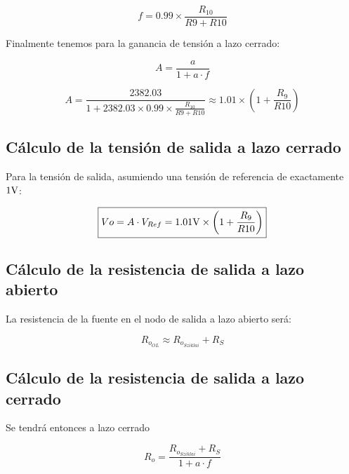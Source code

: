 \begin{equation}
f = 0.99 \times \frac{R_{10}}{R{9} + R{10}}
\end{equation}



Finalmente tenemos para la ganancia de tensión a lazo cerrado:


\begin{equation}
A = \frac{a}{1 + a \cdot f}
\end{equation}

\begin{equation*}
\boxed{ A = \frac{2382.03}{1 + 2382.03 \times 0.99 \times \frac{R_{10}}{R{9} + R{10}}} \approx 1.01 \times \left(  1 + \frac{R_{9}}{R{10}} \right) }
\end{equation*}

\subsection{Cálculo de la tensión de salida a lazo cerrado}


Para la tensión de salida, asumiendo una tensión de referencia de exactamente $1 \si[per-mode=symbol]{\volt}$:

\begin{equation*}
\boxed{ V{o} = A \cdot V_{Ref} = 1.01 \si[per-mode=symbol]{\volt} \times \left(  1 + \frac{R_{9}}{R{10}} \right) }
\end{equation*}



\subsection{Cálculo de la resistencia de salida a lazo abierto}


La resistencia de la fuente en el nodo de salida a lazo abierto será:

\begin{equation}
R_{o_{OL}} \approx R_{o_{Sziklai}} + R_{S}
\end{equation}


\subsection{Cálculo de la resistencia de salida a lazo cerrado}


Se tendrá entonces a lazo cerrado

\begin{equation}
R_{o} =  \frac{R_{o_{Sziklai}} + R_{S}}{1 + a \cdot f} 
\end{equation}


